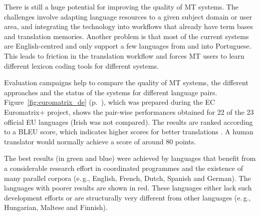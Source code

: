 \begin{multicols}{2}
There is still a huge potential for improving the quality of MT systems. The challenges involve adapting language resources to a given subject domain or user area, and integrating the technology into workflows that already have term bases and translation memories. Another problem is that most of the current systems are English-centred and only support a few languages from and into Portuguese. This leads to friction in the translation workflow and forces MT users to learn different lexicon coding tools for different systems.

Evaluation campaigns help to compare the quality of MT systems, the different approaches and the status of the systems for different language pairs. Figure~\ref{fig:euromatrix_de} (p.~\pageref{fig:euromatrix_de}), which was prepared during the EC Euromatrix+ project, shows the pair-wise performances obtained for 22 of the 23 official EU languages (Irish was not compared). The results are ranked according to a BLEU score, which indicates higher scores for better translations \cite{bleu1}. A human translator would normally achieve a score of around 80 points.

The best results (in green and blue) were achieved by languages that benefit from a considerable research effort in coordinated programmes and the existence of many parallel corpora (e.\,g., English, French, Dutch, Spanish and German). The languages with poorer results are shown in red. These languages either lack such development efforts or are structurally very different from other languages (e.\,g., Hungarian, Maltese and Finnish).


\end{multicols}
